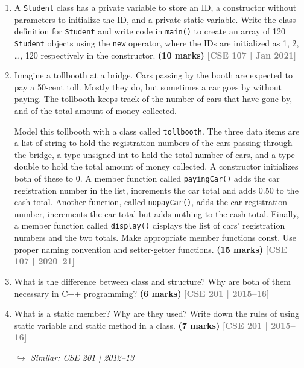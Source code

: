 \documentclass[12pt,a3paper]{article}
\newcommand{\yr}[1]{\hfill\textcolor{gray}{\small\textbf{[#1]}}}
\newcommand{\mk}[1]{\textcolor{orange!70!black}{\small\textbf{(#1 marks)}}}
\newcommand{\variant}[1]{\par\vspace{1pt}\textcolor{blue!50!black}%
  {\footnotesize\textit{$\hookrightarrow$ Similar: #1}}}
\begin{document}
\begin{enumerate}
\item A \texttt{Student} class has a private variable to store an ID, a constructor without parameters to initialize the ID, and a private static variable. Write the class definition for \texttt{Student} and write code in \texttt{main()} to create an array of 120 \texttt{Student} objects using the \texttt{new} operator, where the IDs are initialized as 1, 2, \ldots, 120 respectively in the constructor. \mk{10}
\yr{CSE 107 | Jan 2021}




\item Imagine a tollbooth at a bridge. Cars passing by the booth are expected to pay a 50-cent toll. Mostly they do, but sometimes a car goes by without paying. The tollbooth keeps track of the number of cars that have gone by, and of the total amount of money collected.

Model this tollbooth with a class called \texttt{tollbooth}. The three data items are a list of string to hold the registration numbers of the cars passing through the bridge, a type unsigned int to hold the total number of cars, and a type double to hold the total amount of money collected. A constructor initializes both of these to 0. A member function called \texttt{payingCar()} adds the car registration number in the list, increments the car total and adds 0.50 to the cash total. Another function, called \texttt{nopayCar()}, adds the car registration number, increments the car total but adds nothing to the cash total. Finally, a member function called \texttt{display()} displays the list of cars' registration numbers and the two totals. Make appropriate member functions const. Use proper naming convention and setter-getter functions. \mk{15}
\yr{CSE 107 | 2020--21}




\item What is the difference between class and structure? Why are both of them necessary in C++ programming? \mk{6}
\yr{CSE 201 | 2015--16}




\item What is a static member? Why are they used? Write down the rules of using static variable and static method in a class. \mk{7}
\yr{CSE 201 | 2015--16}
\variant{CSE 201 | 2012--13}


\end{enumerate}
\end{document}
